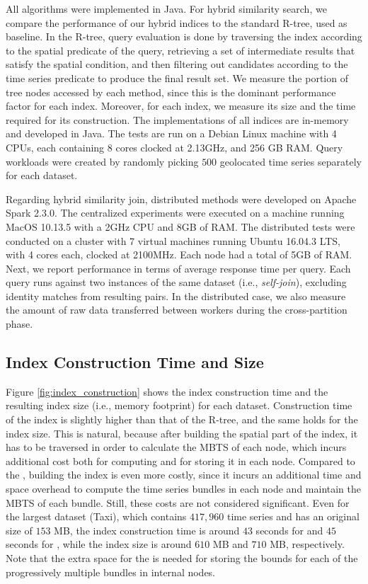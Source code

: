 All algorithms were implemented in Java. For hybrid similarity search, we compare the performance of our hybrid indices to the standard R-tree, used as baseline. In the R-tree, query evaluation is done by traversing the index according to the spatial predicate of the query, retrieving a set of intermediate results that satisfy the spatial condition, and then filtering out candidates according to the time series predicate to produce the final result set. We measure the portion of tree nodes accessed by each method, since this is the dominant performance factor for each index. Moreover, for each index, we measure its size and the time required for its construction. The implementations of all indices are in-memory and developed in Java. The tests are run on a Debian Linux machine with 4 CPUs, each containing 8 cores clocked at 2.13GHz, and 256 GB RAM. Query workloads were created by randomly picking $500$ geolocated time series separately for each dataset.

Regarding hybrid similarity join, distributed methods were developed on Apache Spark 2.3.0. The centralized experiments were executed on a machine running MacOS 10.13.5 with a 2GHz CPU and 8GB of RAM. The distributed tests were conducted on a cluster with 7 virtual machines running Ubuntu 16.04.3 LTS, with 4 cores each, clocked at 2100MHz. Each node had a total of 5GB of RAM. Next, we report performance in terms of average response time per query. Each query runs against two instances of the same dataset (i.e., {\em self-join}), excluding identity matches from resulting pairs. In the distributed case, we also measure the amount of raw data transferred between workers during the cross-partition phase.

\subsection{Index Construction Time and Size}

Figure \ref{fig:index_construction} shows the index construction time and the resulting index size (i.e., memory footprint) for each dataset. Construction time of the \tsr index is slightly higher than that of the R-tree, and the same holds for the index size. This is natural, because after building the spatial part of the index, it has to be traversed in order to calculate the MBTS of each node, which incurs additional cost both for computing and for storing it in each node. Compared to the \tsr, building the \btsr index is even more costly, since it incurs an additional time and space overhead to compute the time series bundles in each node and maintain the MBTS of each bundle. Still, these costs are not considered significant. Even for the largest dataset (Taxi), which contains $417,960$ time series and has an original size of $153$ MB, the index construction time is around $43$ seconds for \tsr and $45$ seconds for \btsr, while the index size is around $610$ MB and $710$ MB, respectively. Note that the extra space for the \btsr is needed for storing the bounds for each of the progressively multiple bundles in internal nodes.

